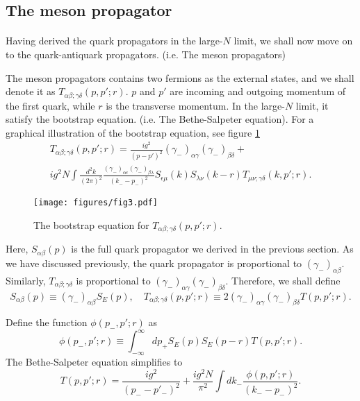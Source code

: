 \documentclass{article}
\begin{document}
\subsection{The meson propagator}
\paragraph{}
Having derived the quark propagators in the large-$N$ limit, we shall now move on to the quark-antiquark propagators. (i.e. The meson propagators)

The meson propagators contains two fermions as the external states, and we shall denote it as $T_{\alpha\beta;\gamma\delta}(p, p{}';r)$. $p$ and $p{}'$ are incoming and outgoing momentum of the first quark, while $r$ is the transverse momentum.
In the large-$N$ limit, it satisfy the bootstrap equation. (i.e. The Bethe-Salpeter equation). For a graphical illustration of the bootstrap equation, see figure \ref{fig3}
\begin{gather*}
    T_{\alpha\beta;\gamma\delta}(p, p{}';r) = \frac{ig^{2}}{(p-p{}')^{2}}(\gamma_{-})_{\alpha\gamma}(\gamma_{-})_{\beta\delta} +\\
    ig^{2}N\int\frac{d^{2}k}{(2\pi)^{2}}\frac{(\gamma_{-})_{\alpha\epsilon}(\gamma_{-})_{\beta\lambda}}{(k_{-}-p_{-})^{2}}S_{\epsilon\mu}(k)S_{\lambda\nu}(k-r)T_{\mu\nu;\gamma\delta}(k, p{}';r).
\end{gather*}

\begin{figure}[h]
		\centering
		\texttt{[image: figures/fig3.pdf]}
    \caption{The bootstrap equation for $T_{\alpha\beta;\gamma\delta}(p, p{}';r)$. \label{fig3}}
\end{figure}

Here, $S_{\alpha\beta}(p)$ is the full quark propagator we derived in the previous section. As we have discussed previously, the quark propagator is proportional to $(\gamma_{-})_{\alpha\beta}$. Similarly, $T_{\alpha\beta;\gamma\delta}$ is proportional to $(\gamma_{-})_{\alpha\gamma}(\gamma_{-})_{\beta\delta}$. Therefore, we shall define
\[ 
    S_{\alpha\beta}(p) \equiv (\gamma_{-})_{\alpha\beta}S_{E}(p),\quad  T_{\alpha\beta;\gamma\delta}(p, p{}';r) \equiv 2(\gamma_{-})_{\alpha\gamma}(\gamma_{-})_{\beta\delta}T(p, p{}';r).
\] 

Define the function $\phi(p_{-}, p{}'; r)$ as 
\[ 
    \phi(p_{-}, p{}'; r) \equiv \int_{-\infty}^{\infty}  dp_{+} S_{E}(p)S_{E}(p-r)T(p, p{}'; r).
\] 
The Bethe-Salpeter equation simplifies to 
\begin{equation}\label{bseq1}
    T(p, p{}'; r) = \frac{ig^2}{(p_{-}-p{}'_{-})^{2}} + \frac{ig^{2}N}{\pi^{2}}\int dk_{-} \frac{\phi(p, p{}';r)}{(k_{-}-p_{-})^{2}}.
\end{equation}
\end{document}
